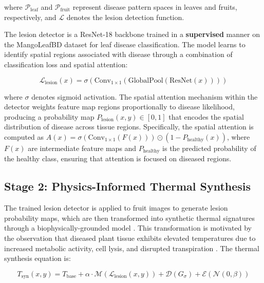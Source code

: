 \documentclass[utf8]{FrontiersinHarvard} %
\begin{document}
where $\mathcal{P}_{\text{leaf}}$ and $\mathcal{P}_{\text{fruit}}$ represent disease pattern spaces in leaves and fruits, respectively, and $\mathcal{L}$ denotes the lesion detection function.

The lesion detector is a ResNet-18 \cite{he2016} backbone trained in a \textbf{supervised} manner on the MangoLeafBD dataset for leaf disease classification. The model learns to identify spatial regions associated with disease through a combination of classification loss and spatial attention:

\begin{equation}
    \mathcal{L}_{\text{lesion}}(x) = \sigma(\text{Conv}_{1\times 1}(\text{GlobalPool}(\text{ResNet}(x))))
    \label{eq:lesion_detector}
\end{equation}

where $\sigma$ denotes sigmoid activation. The spatial attention mechanism within the detector weights feature map regions proportionally to disease likelihood, producing a probability map $P_{\text{lesion}}(x, y) \in [0, 1]$ that encodes the spatial distribution of disease across tissue regions. Specifically, the spatial attention is computed as $A(x) = \sigma(\text{Conv}_{1 \times 1}(F(x))) \odot (1 - P_{\text{healthy}}(x))$, where $F(x)$ are intermediate feature maps and $P_{\text{healthy}}$ is the predicted probability of the healthy class, ensuring that attention is focused on diseased regions.

\subsection{Stage 2: Physics-Informed Thermal Synthesis}
The trained lesion detector is applied to fruit images to generate lesion probability maps, which are then transformed into synthetic thermal signatures through a biophysically-grounded model \cite{raissi2019,karniadakis2021}. This transformation is motivated by the observation that diseased plant tissue exhibits elevated temperatures due to increased metabolic activity, cell lysis, and disrupted transpiration \cite{mahlein2016,pineda2021}. The thermal synthesis equation is:

\begin{equation}
    T_{\text{syn}}(x,y) = T_{\text{base}} + \alpha \cdot \mathcal{M}(\mathcal{L}_{\text{lesion}}(x,y)) + \mathcal{D}(G_{\sigma}) + \mathcal{E}(\mathcal{N}(0,\beta))
    \label{eq:thermal_synthesis}
\end{equation}
\end{document}
